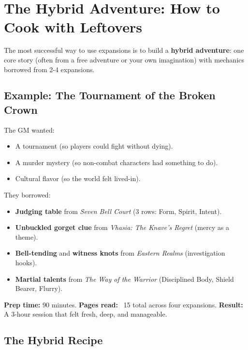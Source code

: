 \section{The Hybrid Adventure: How to Cook with Leftovers}

The most successful way to use expansions is to build a \textbf{hybrid adventure}: one core story (often from a free adventure or your own imagination) with mechanics borrowed from 2-4 expansions.

\subsection{Example: The Tournament of the Broken Crown}

The GM wanted:
\begin{itemize}
\item A tournament (so players could fight without dying).
\item A murder mystery (so non-combat characters had something to do).
\item Cultural flavor (so the world felt lived-in).
\end{itemize}

They borrowed:
\begin{itemize}
\item \textbf{Judging table} from \textit{Seven Bell Court} (3 rows: Form, Spirit, Intent).
\item \textbf{Unbuckled gorget clue} from \textit{Vhasia: The Knave's Regret} (mercy as a theme).
\item \textbf{Bell-tending} and \textbf{witness knots} from \textit{Eastern Realms} (investigation hooks).
\item \textbf{Martial talents} from \textit{The Way of the Warrior} (Disciplined Body, Shield Bearer, Flurry).
\end{itemize}

\textbf{Prep time:} 90 minutes. \textbf{Pages read:} ~15 total across four expansions. \textbf{Result:} A 3-hour session that felt fresh, deep, and manageable.

\subsection{The Hybrid Recipe}

